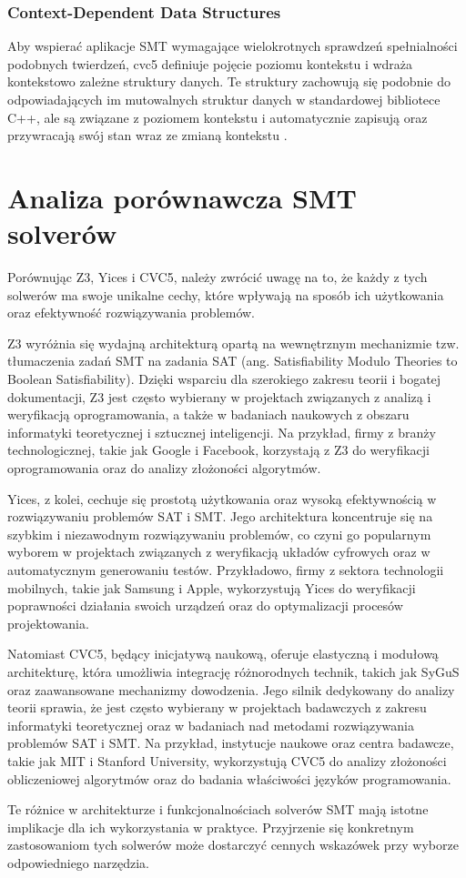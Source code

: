 \subsubsection{Context-Dependent Data Structures} Aby wspierać aplikacje SMT wymagające wielokrotnych sprawdzeń spełnialności podobnych twierdzeń, cvc5 definiuje pojęcie poziomu kontekstu i wdraża kontekstowo zależne struktury danych. Te struktury zachowują się podobnie do odpowiadających im mutowalnych struktur danych w standardowej bibliotece C++, ale są związane z poziomem kontekstu i automatycznie zapisują oraz przywracają swój stan wraz ze zmianą kontekstu \cite{BarbosaBBKLMMMN22}.

\section{Analiza porównawcza SMT solverów}

Porównując Z3, Yices i CVC5, należy zwrócić uwagę na to, że każdy z tych solwerów ma swoje unikalne cechy, które wpływają na sposób ich użytkowania oraz efektywność rozwiązywania problemów.

Z3 wyróżnia się wydajną architekturą opartą na wewnętrznym mechanizmie tzw. tłumaczenia zadań SMT na zadania SAT (ang. Satisfiability Modulo Theories to Boolean Satisfiability). Dzięki wsparciu dla szerokiego zakresu teorii i bogatej dokumentacji, Z3 jest często wybierany w projektach związanych z analizą i weryfikacją oprogramowania, a także w badaniach naukowych z obszaru informatyki teoretycznej i sztucznej inteligencji. Na przykład, firmy z branży technologicznej, takie jak Google i Facebook, korzystają z Z3 do weryfikacji oprogramowania oraz do analizy złożoności algorytmów.

Yices, z kolei, cechuje się prostotą użytkowania oraz wysoką efektywnością w rozwiązywaniu problemów SAT i SMT. Jego architektura koncentruje się na szybkim i niezawodnym rozwiązywaniu problemów, co czyni go popularnym wyborem w projektach związanych z weryfikacją układów cyfrowych oraz w automatycznym generowaniu testów. Przykładowo, firmy z sektora technologii mobilnych, takie jak Samsung i Apple, wykorzystują Yices do weryfikacji poprawności działania swoich urządzeń oraz do optymalizacji procesów projektowania.

Natomiast CVC5, będący inicjatywą naukową, oferuje elastyczną i modułową architekturę, która umożliwia integrację różnorodnych technik, takich jak SyGuS oraz zaawansowane mechanizmy dowodzenia.  Jego silnik dedykowany do analizy teorii sprawia, że jest często wybierany w projektach badawczych z zakresu informatyki teoretycznej oraz w badaniach nad metodami rozwiązywania problemów SAT i SMT. Na przykład, instytucje naukowe oraz centra badawcze, takie jak MIT i Stanford University, wykorzystują CVC5 do analizy złożoności obliczeniowej algorytmów oraz do badania właściwości języków programowania.

Te różnice w architekturze i funkcjonalnościach solverów SMT mają istotne implikacje dla ich wykorzystania w praktyce. Przyjrzenie się konkretnym zastosowaniom tych solwerów może dostarczyć cennych wskazówek przy wyborze odpowiedniego narzędzia.

